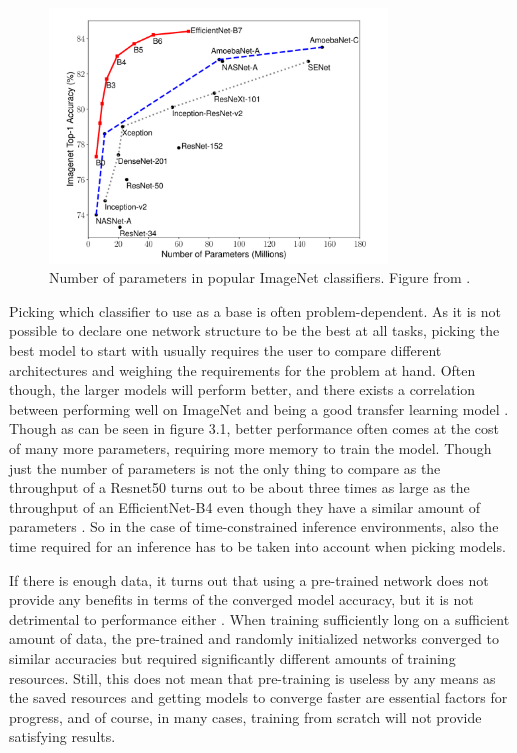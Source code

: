 \begin{figure}[h!]
    \centering
    \includegraphics[width=0.8\textwidth]{imgs/imagenet_parameters.png}
    \caption{Number of parameters in popular ImageNet classifiers. Figure from \citep{efficientNet}.\label{fig:params}}
\end{figure}

Picking which classifier to use as a base is often problem-dependent. As it is not possible to declare one network structure to be the best at all tasks, picking the best model to start with usually requires the user to compare different architectures and weighing the requirements for the problem at hand. Often though, the larger models will perform better, and there exists a correlation between performing well on ImageNet and being a good transfer learning model \citep{betterTransfer}. Though as can be seen in figure 3.1, better performance often comes at the cost of many more parameters, requiring more memory to train the model. Though just the number of parameters is not the only thing to compare as the throughput of a Resnet50 turns out to be about three times as large as the throughput of an EfficientNet-B4 even though they have a similar amount of parameters \citep{classifierPerformance}. So in the case of time-constrained inference environments, also the time required for an inference has to be taken into account when picking models.

If there is enough data, it turns out that using a pre-trained network does not provide any benefits in terms of the converged model accuracy, but it is not detrimental to performance either \citep{rethinkTransfer}. When training sufficiently long on a sufficient amount of data, the pre-trained and randomly initialized networks converged to similar accuracies but required significantly different amounts of training resources. Still, this does not mean that pre-training is useless by any means as the saved resources and getting models to converge faster are essential factors for progress, and of course, in many cases, training from scratch will not provide satisfying results.

